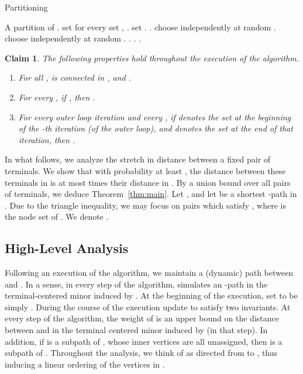 \documentclass[twoside,leqno,twocolumn]{article}
\newtheorem{claim}[lemma]{Claim}
\newtheorem{claim}[theorem]{Claim}
\def\compactify{\itemsep=0pt \topsep=0pt \partopsep=0pt \parsep=0pt}
\begin{document}
\begin{algorithm}[H]
\caption{Partitioning }
\label{alg:part}
\begin{algorithmic}[1]
\REQUIRE 
\ENSURE A partition  of .
\STATE set 
\STATE for every  set , .
\STATE set . 
\WHILE{} \label{al:outer} 
\STATE .
\FORALL{} \label{al:inner}
\ifprocs
\STATE choose independently\! at\!  random\! .
\else
\STATE choose independently at  random .
\fi
\STATE .
\STATE . 
\ENDFOR
\ENDWHILE \label{al:endOuter}
\RETURN .
\end{algorithmic}
\end{algorithm}

\begin{claim}
The following properties hold throughout the execution of the algorithm.
\begin{enumerate} \compactify
	\item For all ,  is connected in , and .
	\item For every , if , then .
	\item For every outer loop iteration  and every , 
if  denotes the set  at the beginning of the -th iteration (of the outer loop), and  denotes the set  at the end of that iteration, 
then .
\end{enumerate}
\end{claim}

In what follows, we analyze the stretch in distance between a fixed pair of terminals. We show that with probability at least , the distance between these terminals in  is at most  times their distance in . By a union bound over all  pairs of terminals, we deduce Theorem~\ref{thm:main}.
Let , and let  be a shortest -path in . Due to the triangle inequality, we may focus on pairs which satisfy , where  is the node set of . We denote .

\subsection{High-Level Analysis}
Following an execution of the algorithm, we maintain a (dynamic) path  between  and . In a sense, in every step of the algorithm,  simulates an -path in the terminal-centered minor induced by . At the beginning of the execution, set  to be simply . During the course of the execution update  to satisfy two invariants. At every step of the algorithm, the weight of  is an upper bound on the distance between  and  in the terminal centered minor induced by  (in that step). In addition, if  is a subpath of , whose inner vertices are all unassigned, then  is a subpath of . Throughout the analysis, we think of  as directed from  to , thus inducing a linear ordering of the vertices in . 
\end{document}
